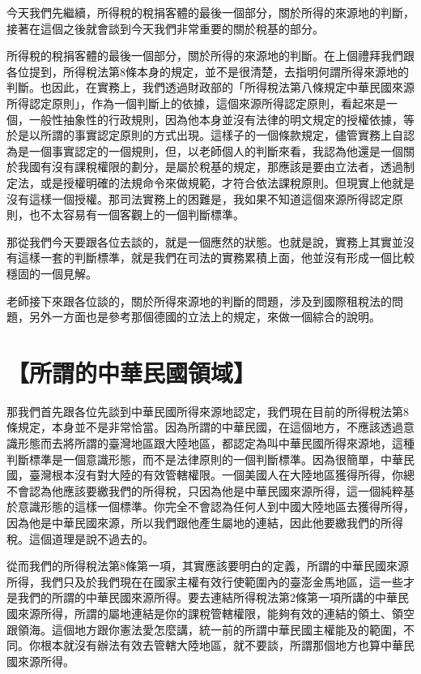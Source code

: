\documentclass[]{ctexbook}
\begin{document}
今天我們先繼續，所得稅的稅捐客體的最後一個部分，關於所得的來源地的判斷，接著在這個之後就會談到今天我們非常重要的關於稅基的部分。

所得稅的稅捐客體的最後一個部分，關於所得的來源地的判斷。在上個禮拜我們跟各位提到，所得稅法第8條本身的規定，並不是很清楚，去指明何謂所得來源地的判斷。也因此，在實務上，我們透過財政部的「所得稅法第八條規定中華民國來源所得認定原則」，作為一個判斷上的依據，這個來源所得認定原則，看起來是一個，一般性抽象性的行政規則，因為他本身並沒有法律的明文規定的授權依據，等於是以所謂的事實認定原則的方式出現。這樣子的一個條款規定，儘管實務上自認為是一個事實認定的一個規則，但，以老師個人的判斷來看，我認為他還是一個關於我國有沒有課稅權限的劃分，是屬於稅基的規定，那應該是要由立法者，透過制定法，或是授權明確的法規命令來做規範，才符合依法課稅原則。但現實上他就是沒有這樣一個授權。那司法實務上的困難是，我如果不知道這個來源所得認定原則，也不太容易有一個客觀上的一個判斷標準。

那從我們今天要跟各位去談的，就是一個應然的狀態。也就是說，實務上其實並沒有這樣一套的判斷標準，就是我們在司法的實務累積上面，他並沒有形成一個比較穩固的一個見解。

老師接下來跟各位談的，關於所得來源地的判斷的問題，涉及到國際租稅法的問題，另外一方面也是參考那個德國的立法上的規定，來做一個綜合的說明。

\hypertarget{ux6240ux8b02ux7684ux4e2dux83efux6c11ux570bux9818ux57df}{%
\section{【所謂的中華民國領域】}\label{ux6240ux8b02ux7684ux4e2dux83efux6c11ux570bux9818ux57df}}

那我們首先跟各位先談到中華民國所得來源地認定，我們現在目前的所得稅法第8條規定，本身並不是非常恰當。因為所謂的中華民國，在這個地方，不應該透過意識形態而去將所謂的臺灣地區跟大陸地區，都認定為叫中華民國所得來源地，這種判斷標準是一個意識形態，而不是法律原則的一個判斷標準。因為很簡單，中華民國，臺灣根本沒有對大陸的有效管轄權限。一個美國人在大陸地區獲得所得，你總不會認為他應該要繳我們的所得稅，只因為他是中華民國來源所得，這一個純粹基於意識形態的這樣一個標準。你完全不會認為任何人到中國大陸地區去獲得所得，因為他是中華民國來源，所以我們跟他產生屬地的連結，因此他要繳我們的所得稅。這個道理是說不過去的。

從而我們的所得稅法第8條第一項，其實應該要明白的定義，所謂的中華民國來源所得，我們只及於我們現在在國家主權有效行使範圍內的臺澎金馬地區，這一些才是我們的所謂的中華民國來源所得。要去連結所得稅法第2條第一項所講的中華民國來源所得，所謂的屬地連結是你的課稅管轄權限，能夠有效的連結的領土、領空跟領海。這個地方跟你憲法愛怎麼講，統一前的所謂中華民國主權能及的範圍，不同。你根本就沒有辦法有效去管轄大陸地區，就不要談，所謂那個地方也算中華民國來源所得。
\end{document}
